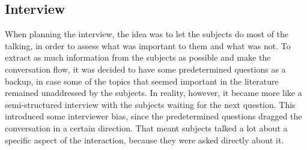 \subsection{Interview}
When planning the interview, the idea was to let the subjects do most of the talking, in order to assess what was important to them and what was not. To extract as much information from the subjects as possible and make the conversation flow, it was decided to have some predetermined questions as a backup, in case some of the topics that seemed important in the literature remained unaddressed by the subjects. In reality, however, it became more like a semi-structured interview with the subjects waiting for the next question. This introduced some interviewer bias, since the predetermined questions dragged the conversation in a certain direction. That meant subjects talked a lot about a specific aspect of the interaction, because they were asked directly about it.